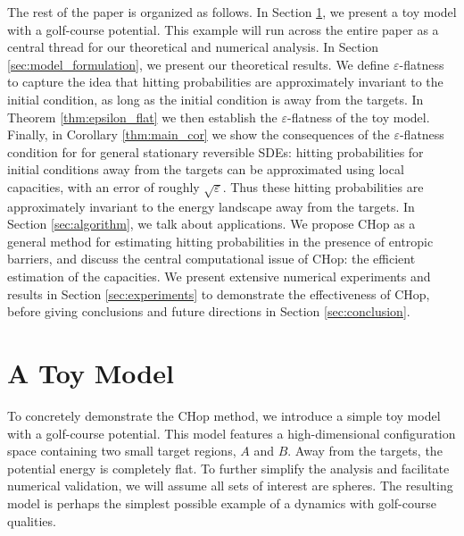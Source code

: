 \documentclass[english, aip, jcp, priprint, graphicx,floatfix]{revtex4-1}
\theoremstyle{plain}
\theoremstyle{definition}
\theoremstyle{plain}
\begin{document}
The rest of the paper is organized as follows. In Section \ref{sec:toy_model}, we present a toy model with a golf-course potential.  This example will run across the entire paper as a central thread for our theoretical and numerical analysis. In Section \ref{sec:model_formulation}, we present our theoretical results. We define $\varepsilon$-flatness to capture the idea that hitting probabilities are approximately invariant to the initial condition, as long as the initial condition is away from the targets.  In Theorem \ref{thm:epsilon_flat} we then establish the $\varepsilon$-flatness of the toy model. Finally, in Corollary \ref{thm:main_cor} we show the consequences of the $\varepsilon$-flatness condition for for general stationary reversible SDEs: hitting probabilities for initial conditions away from the targets can be approximated using local capacities, with an error of roughly $\sqrt\varepsilon$.  Thus these hitting probabilities are approximately invariant to the energy landscape away from the targets.  In Section \ref{sec:algorithm}, we talk about applications. We propose CHop as a general method for estimating hitting probabilities in the presence of entropic barriers, and discuss the central computational issue of CHop: the efficient estimation of the capacities. We present extensive numerical experiments and results in Section \ref{sec:experiments} to demonstrate the effectiveness of CHop, before giving conclusions and future directions in Section \ref{sec:conclusion}.


\section{A Toy Model}\label{sec:toy_model}

To concretely demonstrate the CHop method, we introduce a simple toy model with a golf-course potential.  This model features a high-dimensional configuration space containing two small target regions, $A$ and $B$.  Away from the targets, the potential energy is completely flat.  To further simplify the analysis and facilitate numerical validation, we will assume all sets of interest are spheres.  The resulting model is perhaps the simplest possible example of a dynamics with golf-course qualities.  
\end{document}
